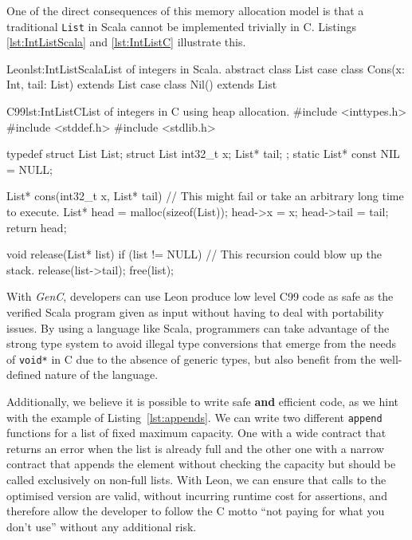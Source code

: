 \documentclass[a4paper,twoside]{article}
\newcommand{\InlineC}[1]{\lstinline[language=C99]|#1|}
\newcommand{\InlineS}[1]{\lstinline[language=Leon]|#1|}
\newcommand{\GenC}{\emph{GenC}\xspace}
\newcommand{\RefCode}[1]{Listing~\ref{#1}}
\begin{document}
One of the direct consequences of this memory allocation model is that a
traditional \InlineS{List} in Scala cannot be implemented trivially in C.
Listings \ref{lst:IntListScala} and \ref{lst:IntListC} illustrate this.

\begin{Code}{Leon}{lst:IntListScala}{List of integers in Scala.}
abstract class List
case class Cons(x: Int, tail: List) extends List
case class Nil() extends List
\end{Code}

\begin{Code}{C99}{lst:IntListC}{List of integers in C using heap allocation.}
#include <inttypes.h>
#include <stddef.h>
#include <stdlib.h>

typedef struct List List;
struct List { int32_t x; List* tail; };
static List* const NIL = NULL;

List* cons(int32_t x, List* tail) {
  // This might fail or take an arbitrary long time to execute.
  List* head = malloc(sizeof(List));
  head->x = x;
  head->tail = tail;
  return head;
}

void release(List* list) {
  if (list != NULL) {
    // This recursion could blow up the stack.
    release(list->tail);
    free(list);
  }
}
\end{Code}

With \GenC, developers can use Leon produce low level C99 code as safe as the
verified Scala program given as input without having to deal with portability
issues. By using a language like Scala, programmers can take advantage of the
strong type system to avoid illegal type conversions that emerge from the needs
of \InlineC{void*} in C due to the absence of generic types, but also benefit
from the well-defined nature of the language.

Additionally, we believe it is possible to write safe \textbf{and} efficient
code, as we hint with the example of \RefCode{lst:appends}. We can write two
different \InlineS{append} functions for a list of fixed maximum capacity. One
with a wide contract that returns an error when the list is already full and the
other one with a narrow contract that appends the element without checking the
capacity but should be called exclusively on non-full lists. With Leon, we can
ensure that calls to the optimised version are valid, without incurring runtime
cost for assertions, and therefore allow the developer to follow the C motto
``not paying for what you don't use'' without any additional risk.
\end{document}
